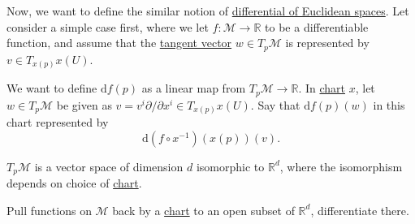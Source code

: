 Now, we want to define the similar notion of \hyperref[def:differential-of-Euclidean-space]{differential of Euclidean spaces}. Let consider a simple case first, where we let \(f\colon \mathcal{M} \to \mathbb{R} \) to be a differentiable function, and assume that the \hyperref[def:tangent-vector]{tangent vector} \(w\in T_p \mathcal{M} \) is represented by \(v\in T_{x(p)}x(U)\).

\begin{intuition}
	We want to define \(\mathrm{d} f(p)\) as a linear map from \(T_p \mathcal{M} \to \mathbb{R} \). In \hyperref[def:coordinate-chart]{chart} \(x\), let \(w\in T_p \mathcal{M} \) be given as \(v = v^i \partial /\partial x^i\in T_{x(p)}x(U)\). Say that \(\mathrm{d} f(p)(w)\) in this chart represented by
	\[
		\mathrm{d} (f \circ x ^{-1} )(x(p)) (v).
	\]
	\begin{center}
	\end{center}
\end{intuition}

\begin{remark}
	\(T_p \mathcal{M} \) is a vector space of dimension \(d\) isomorphic to \(\mathbb{R} ^d\), where the isomorphism depends on choice of \hyperref[def:coordinate-chart]{chart}.
\end{remark}

\begin{intuition}
	Pull functions on \(\mathcal{M} \) back by a \hyperref[def:coordinate-chart]{chart} to an open subset of \(\mathbb{R} ^d\), differentiate there.
\end{intuition}

